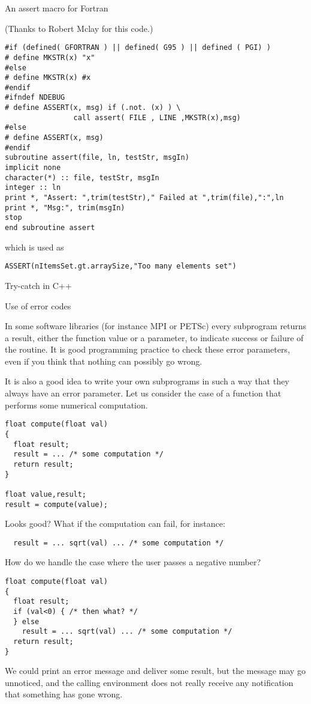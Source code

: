  {An assert macro for Fortran}

(Thanks to Robert Mclay for this code.)

\begin{verbatim}
#if (defined( GFORTRAN ) || defined( G95 ) || defined ( PGI) )
# define MKSTR(x) "x"
#else
# define MKSTR(x) #x
#endif
#ifndef NDEBUG
# define ASSERT(x, msg) if (.not. (x) ) \
                call assert( FILE , LINE ,MKSTR(x),msg)
#else
# define ASSERT(x, msg)
#endif
subroutine assert(file, ln, testStr, msgIn)
implicit none
character(*) :: file, testStr, msgIn
integer :: ln
print *, "Assert: ",trim(testStr)," Failed at ",trim(file),":",ln
print *, "Msg:", trim(msgIn)
stop
end subroutine assert
\end{verbatim}
which is used as
\begin{verbatim}
ASSERT(nItemsSet.gt.arraySize,"Too many elements set")
\end{verbatim}

\begin{notready}
 {Try-catch in C++}
\end{notready}


 {Use of error codes}

In some software libraries (for instance MPI or PETSc) every subprogram
returns a result, either the function value or a parameter, to
indicate success or failure of the routine. It is good programming
practice to check these error parameters, even if you think that
nothing can possibly go wrong.

It is also a good idea to write your own subprograms in such a way
that they always have an error parameter. Let us consider the case of
a function that performs some numerical computation.

\begin{verbatim}
float compute(float val)
{
  float result;
  result = ... /* some computation */
  return result;
}

float value,result;
result = compute(value);
\end{verbatim}
Looks good? What if the computation can fail, for instance:
\begin{verbatim}
  result = ... sqrt(val) ... /* some computation */
\end{verbatim}
How do we handle the case where the user passes a negative number?
\begin{verbatim}
float compute(float val)
{
  float result;
  if (val<0) { /* then what? */ 
  } else 
    result = ... sqrt(val) ... /* some computation */
  return result;
}
\end{verbatim}
We could print an error message and deliver some result, but the
message may go unnoticed, and the calling environment does not really
receive any notification that something has gone wrong.

